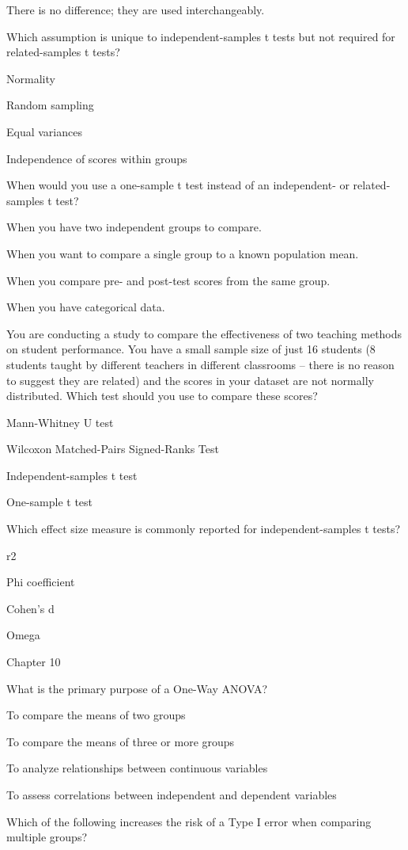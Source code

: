 \documentclass[
  letterpaper,
  DIV=11,
  numbers=noendperiod]{scrreprt}
\begin{document}
There is no difference; they are used interchangeably.

Which assumption is unique to independent-samples t tests but not
required for related-samples t tests?

Normality

Random sampling

Equal variances

Independence of scores within groups

When would you use a one-sample t test instead of an independent- or
related-samples t test?

When you have two independent groups to compare.

When you want to compare a single group to a known population mean.

When you compare pre- and post-test scores from the same group.

When you have categorical data.

You are conducting a study to compare the effectiveness of two teaching
methods on student performance. You have a small sample size of just 16
students (8 students taught by different teachers in different
classrooms -- there is no reason to suggest they are related) and the
scores in your dataset are not normally distributed. Which test should
you use to compare these scores?

Mann-Whitney U test

Wilcoxon Matched-Pairs Signed-Ranks Test

Independent-samples t test

One-sample t test

Which effect size measure is commonly reported for independent-samples t
tests?

r2

Phi coefficient

Cohen's d

Omega

Chapter 10

What is the primary purpose of a One-Way ANOVA?

To compare the means of two groups

To compare the means of three or more groups

To analyze relationships between continuous variables

To assess correlations between independent and dependent variables

Which of the following increases the risk of a Type I error when
comparing multiple groups?
\end{document}
